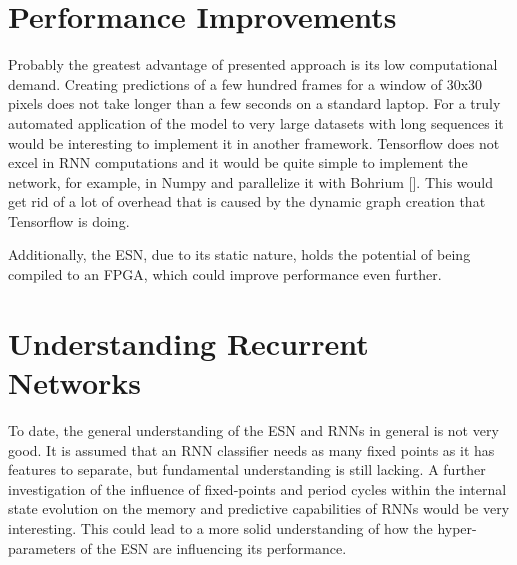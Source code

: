 \section{Performance Improvements}
Probably the greatest advantage of presented approach is its low computational
demand. Creating predictions of a few hundred frames for a window of 30x30 pixels
does not take longer than a few seconds on a standard laptop.
For a truly automated application of the model to very large datasets with long
sequences it would be interesting to implement it in another framework.
Tensorflow does not excel in RNN computations and it would be quite simple to
implement the network, for example, in Numpy and parallelize it with Bohrium
[\cite{bohrium}]. This would get rid of a lot of overhead that is caused by the
dynamic graph creation that Tensorflow is doing.

Additionally, the ESN, due to its static nature, holds the potential of being
compiled to an FPGA, which could improve performance even further.


\section{Understanding Recurrent Networks}

To date, the general understanding of the ESN and RNNs in general is not very
good.  It is assumed that an RNN classifier needs as many fixed points as it
has features to separate, but fundamental understanding is still lacking.  A
further investigation of the influence of fixed-points and period cycles within
the internal state evolution on the memory and predictive capabilities of RNNs
would be very interesting.  This could lead to a more solid understanding of
how the hyper-parameters of the ESN are influencing its performance.
